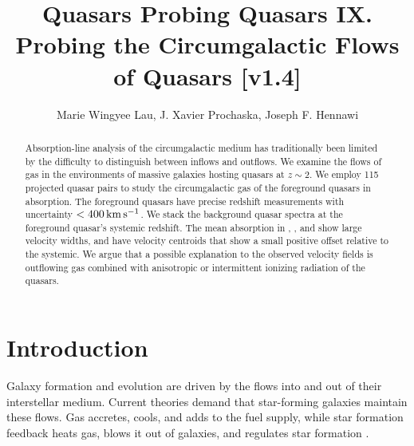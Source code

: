 \documentclass[iop]{emulateapj}
\begin{document}
\title{Quasars Probing Quasars IX. Probing the Circumgalactic Flows of Quasars [v1.4]}

\author{Marie Wingyee Lau, J. Xavier Prochaska, 
Joseph F. Hennawi
}

\begin{abstract}
Absorption-line analysis of the circumgalactic medium has traditionally been limited by the 
difficulty to distinguish between inflows and outflows. We examine the flows of gas in the 
environments of massive galaxies hosting quasars at $z\sim2$. We employ 115 projected quasar pairs 
to study the circumgalactic gas of the foreground quasars in absorption. The foreground quasars 
have precise redshift measurements with uncertainty $<400\,{\rm km\,s^{-1}}$. We stack the 
background quasar spectra at the foreground quasar's systemic redshift. The mean absorption in 
, , and  show large velocity widths, and have velocity 
centroids that show a small positive offset relative to the systemic. We argue that a possible 
explanation to the observed velocity fields is outflowing gas combined with anisotropic or 
intermittent ionizing radiation of the quasars. 
\end{abstract}



\section{Introduction}
\label{sec:introduction}

Galaxy formation and evolution are driven by the flows into and out of their interstellar medium. 
Current theories demand that star-forming galaxies maintain these flows. Gas accretes, cools, and 
adds to the fuel supply, while star formation feedback heats gas, blows it out of galaxies, and 
regulates star formation \citep[for a review see][]{SomervilleDave15}. 
\end{document}
